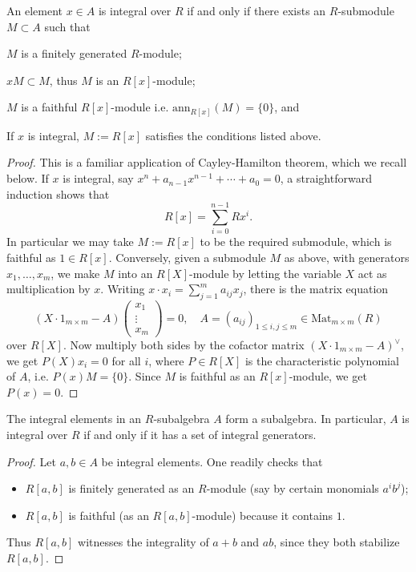 \begin{proposition}
	An element $x \in A$ is integral over $R$ if and only if there exists an $R$-submodule $M \subset A$ such that
	\begin{compactitem}
		\item $M$ is a finitely generated $R$-module;
		\item $xM \subset M$, thus $M$ is an $R[x]$-module;
		\item $M$ is a faithful $R[x]$-module i.e. $\mathrm{ann}_{R[x]}(M) = \{0\}$, and
	\end{compactitem}
	If $x$ is integral, $M := R[x]$ satisfies the conditions listed above.
\end{proposition}
\begin{proof}
	This is a familiar application of Cayley-Hamilton theorem, which we recall below. If $x$ is integral, say $x^n + a_{n-1} x^{n-1} + \cdots + a_0 = 0$, a straightforward induction shows that
	\[ R[x] = \sum_{i=0}^{n-1} Rx^i. \]
	In particular we may take $M := R[x]$ to be the required submodule, which is faithful as $1 \in R[x]$. Conversely, given a submodule $M$ as above, with generators $x_1, \ldots, x_m$, we make $M$ into an $R[X]$-module by letting the variable $X$ act as multiplication by $x$. Writing $x \cdot x_i = \sum_{j=1}^m a_{ij} x_j$, there is the matrix equation
	\[ (X \cdot 1_{m \times m} - A) \begin{pmatrix} x_1 \\ \vdots \\ x_m \end{pmatrix} = 0, \quad A = (a_{ij})_{1 \leq i,j \leq m} \in \text{Mat}_{m \times m}(R) \]
	over $R[X]$. Now multiply both sides by the cofactor matrix $(X \cdot 1_{m \times m} - A)^\vee$, we get $P(X) x_i = 0$ for all $i$, where $P \in R[X]$ is the characteristic polynomial of $A$, i.e. $P(x)M = \{0\}$. Since $M$ is faithful as an $R[x]$-module, we get $P(x)=0$.
\end{proof}

\begin{corollary}
	The integral elements in an $R$-subalgebra $A$ form a subalgebra. In particular, $A$ is integral over $R$ if and only if it has a set of integral generators.
\end{corollary}
\begin{proof}
	Let $a, b \in A$ be integral elements. One readily checks that
	\begin{itemize}
		\item $R[a,b]$ is finitely generated as an $R$-module (say by certain monomials $a^i b^j$);
		\item $R[a,b]$ is faithful (as an $R[a,b]$-module) because it contains $1$.
	\end{itemize}
	Thus $R[a,b]$ witnesses the integrality of $a+b$ and $ab$, since they both stabilize $R[a,b]$.
\end{proof}

